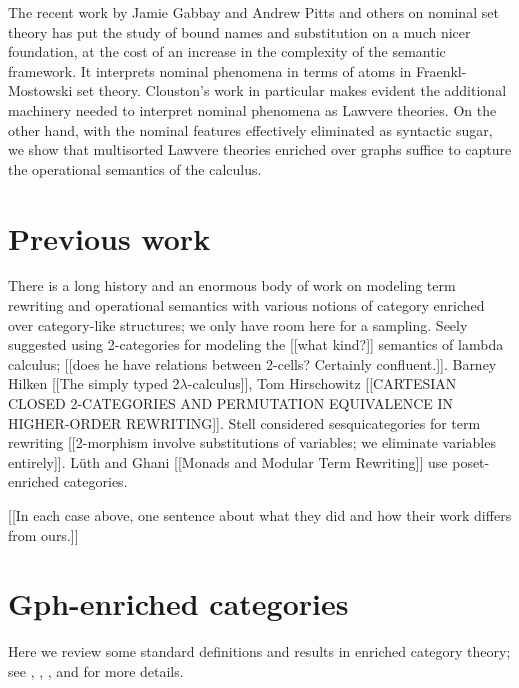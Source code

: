 \documentclass[a4paper,UKenglish]{lipics-v2016}
\begin{document}
The recent work by Jamie Gabbay and Andrew Pitts
\cite{DBLP:journals/fac/GabbayP02} and others
\cite{DBLP:journals/jcss/Clouston14} on nominal set theory has put the
study of bound names and substitution on a much nicer foundation, at
the cost of an increase in the complexity of the semantic
framework. It interprets nominal phenomena in terms of atoms in
Fraenkl-Mostowski set theory. Clouston's work in particular makes
evident the additional machinery needed to interpret nominal phenomena
as Lawvere theories. On the other hand, with the nominal features
effectively eliminated as syntactic sugar, we show that multisorted
Lawvere theories enriched over graphs suffice to capture the
operational semantics of the calculus.

\section{Previous work}
There is a long history and an enormous body of work on modeling term rewriting and operational semantics with various notions of category enriched over category-like structures; we only have room here for a sampling.  Seely \cite{Seely} 
suggested using 2-categories for modeling the [[what kind?]] semantics of lambda calculus; [[does he have relations between 2-cells?  Certainly confluent.]].  Barney Hilken [[The simply typed 2$\lambda$-calculus]], Tom Hirschowitz [[CARTESIAN CLOSED 2-CATEGORIES AND PERMUTATION EQUIVALENCE IN HIGHER-ORDER REWRITING]].  Stell \cite{Stell}
considered sesquicategories for term rewriting [[2-morphism involve substitutions of variables; we eliminate variables entirely]].  L\"uth and Ghani [[Monads and Modular Term Rewriting]] use poset-enriched categories.

[[In each case above, one sentence about what they did and how their work differs from ours.]]

\section{Gph-enriched categories}
Here we review some standard definitions and results in enriched category theory; see \cite{CIS-335497}, \cite{Power99EnrichedLawvereTheories}, \cite{DBLP:journals/acs/LackR11}, and \cite{Trimble} for more details.
\end{document}
